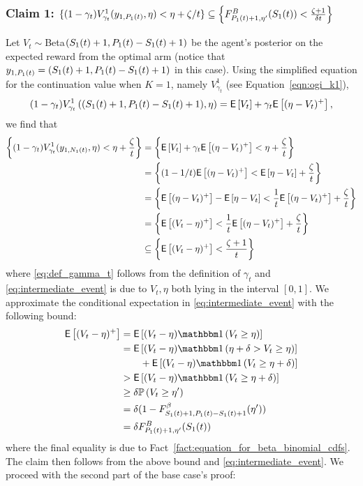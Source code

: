 \begin{myproof}[Proof.]
	\subsubsection*{Claim 1: $\{(1-\gamma_t)V^1_{\gamma_t}(y_{1,P_{1}(t)}, \eta) < \eta + \zeta/t\} \subseteq \left\{F^B_{P_{1}(t)+1, \eta'}(S_1(t)) < \frac{\zeta + 1}{\delta t}\right\}$}
	Let $V_t \sim $Beta$(S_1(t)+1,P_{1}(t) - S_1(t) + 1)$ be the agent's posterior on the expected reward from the optimal arm (notice that $y_{1,P_{1}(t)} = (S_1(t)+1,P_{1}(t) - S_1(t) + 1)$ in this case). Using the simplified equation for the continuation value when $K =1$, namely $V^1_{\gamma_t}$ (see Equation~\eqref{eqn:ogi_k1}), 
	\[
		(1-\gamma_t)V^1_{\gamma_t}\left((S_1(t)+1, P_{1}(t) - S_1(t) + 1), \eta\right) = \mathsf{E} \left[ V_t \right] + \gamma_t\mathsf{E} \left[ (\eta - V_t)^+ \right],
	\] 
	we find that
	\begin{align}
	\left\{(1-\gamma_t)V^1_{\gamma_t}(y_{1,N_{1}(t)}, \eta) < \eta + \frac{\zeta}{t}\right\} & = \left\{ \mathsf{E} \left[ V_t  \right] + \gamma_t\mathsf{E} \left[ (\eta - V_t)^+ \right] < \eta + \frac{\zeta}{t}\right\} \nonumber\\
	& =  \left\{ (1-1/t)\mathsf{E} \left[ (\eta - V_t)^+ \right] < \mathsf{E} \left[ \eta - V_t \right] +\frac{\zeta}{t} \right\} \label{eq:def_gamma_t} \\
	& =  \left\{ \mathsf{E} \left[ (\eta - V_t)^+ \right] - \mathsf{E} \left[ \eta - V_t \right] <  \frac{1}{t}\mathsf{E} \left[ (\eta - V_t)^+ \right] +\frac{\zeta}{t}\right\} \nonumber\\
	& =  \left\{ \mathsf{E} \left[ (V_t - \eta)^+ \right]<  \frac{1}{t}\mathsf{E} \left[ (\eta - V_t)^+ \right] +\frac{\zeta}{t}\right\} \nonumber\\
	& \subseteq \left\{ \mathsf{E} \left[  (V_t - \eta)^+ \right]< \frac{\zeta + 1}{t}  \right\} \label{eq:intermediate_event}
	\end{align}
	where \eqref{eq:def_gamma_t} follows from the definition of $\gamma_t$ and \eqref{eq:intermediate_event} is due to $V_t, \eta$ both lying in the interval $[0,1]$. We approximate the conditional expectation in \eqref{eq:intermediate_event} with the following bound:
	\begin{align}
	\Ee{(V_t - \eta)^+ } & = \Ee{(V_t - \eta) \ind{V_t \ge \eta} }\nonumber \\
	& = \Ee{(V_t - \eta) \ind{\eta + \delta > V_t \ge \eta} }  \nonumber \\
	& \qquad + \Ee{(V_t - \eta) \ind{ V_t \ge \eta + \delta} } \nonumber \\
	& > \Ee{(V_t - \eta) \ind{ V_t \ge \eta + \delta} } \nonumber \\
	& \ge \delta\P{ V_t \ge \eta' } \nonumber \\
	& = \delta (1 - F^\beta_{S_1(t)+1,\Nt{1}-S_1(t)+1}(\eta'))  \nonumber\\ 
	& = \delta F^B_{\Nt{1}+1,\eta'}(S_1(t)) \label{ineq:lower_bound_on_ppart_term}
	\end{align}
	where the final equality is due to Fact~\ref{fact:equation_for_beta_binomial_cdfs}. The claim then follows from the above bound and \eqref{eq:intermediate_event}. We proceed with the second part of the base case's proof:

\end{myproof}
